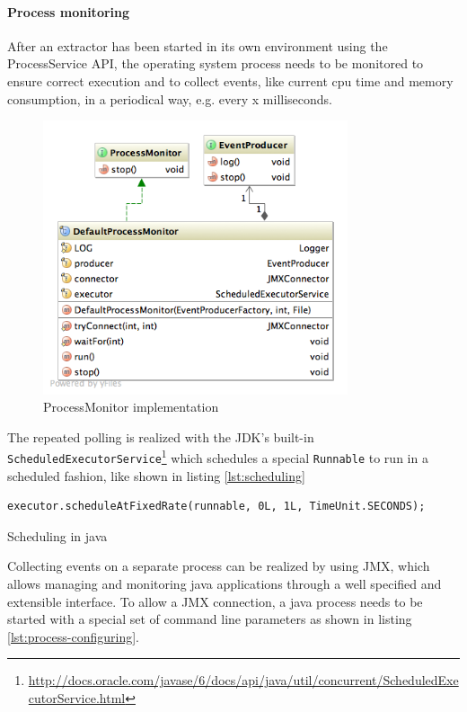 \newpage
\paragraph{Process monitoring}
After an extractor has been started in its own environment using the ProcessService API, the operating system process needs to be monitored to ensure correct execution and to collect events, like current cpu time and memory consumption, in a periodical way, e.g. every x milliseconds. 

\begin{figure}[H]
\centering
\includegraphics[width=0.8\textwidth]{monitor.png}
\caption{ProcessMonitor implementation}
\end{figure}

The repeated polling is realized with the JDK's built-in \\ \texttt{ScheduledExecutorService}\footnote{\url{http://docs.oracle.com/javase/6/docs/api/java/util/concurrent/ScheduledExecutorService.html}} which schedules a special \texttt{Runnable} to run in a scheduled fashion, like shown in listing \ref{lst:scheduling}

\begin{listing}[H]
\begin{verbatim}
executor.scheduleAtFixedRate(runnable, 0L, 1L, TimeUnit.SECONDS);
\end{verbatim}
\caption{Scheduling in java}
\label{lst:scheduling}
\end{listing}

\newpage
Collecting events on a separate process can be realized by using \gls{JMX}, which allows managing and monitoring java applications through a well specified and extensible interface. To allow a \gls{JMX} connection, a java process needs to be started with a special set of command line parameters as shown in listing \ref{lst:process-configuring}.

